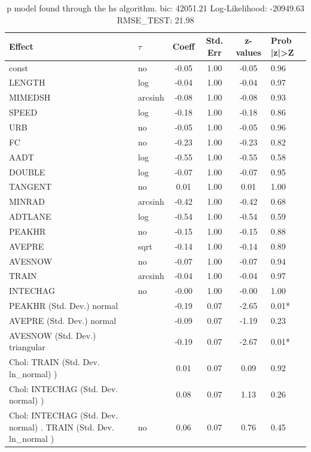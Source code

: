 \begin{table}
	\caption{p model found through the hs algorithm. bic: 42051.21 Log-Likelihood: -20949.63 RMSE_TEST: 21.98}
	\begin{center}
		\begin{tabular}{|l|l|c|c|c|l|}
			\hline
			Effect & $\tau$ & Coeff & Std. Err & z-values & Prob |z|>Z \\
			\hline
			const & no & -0.05 & 1.00 & -0.05 & 0.96 \\
			\hline
			LENGTH & log & -0.04 & 1.00 & -0.04 & 0.97 \\
			\hline
			MIMEDSH & arcsinh & -0.08 & 1.00 & -0.08 & 0.93 \\
			\hline
			SPEED & log & -0.18 & 1.00 & -0.18 & 0.86 \\
			\hline
			URB & no & -0.05 & 1.00 & -0.05 & 0.96 \\
			\hline
			FC & no & -0.23 & 1.00 & -0.23 & 0.82 \\
			\hline
			AADT & log & -0.55 & 1.00 & -0.55 & 0.58 \\
			\hline
			DOUBLE & log & -0.07 & 1.00 & -0.07 & 0.95 \\
			\hline
			TANGENT & no & 0.01 & 1.00 & 0.01 & 1.00 \\
			\hline
			MINRAD & arcsinh & -0.42 & 1.00 & -0.42 & 0.68 \\
			\hline
			ADTLANE & log & -0.54 & 1.00 & -0.54 & 0.59 \\
			\hline
			PEAKHR & no & -0.15 & 1.00 & -0.15 & 0.88 \\
			\hline
			AVEPRE & sqrt & -0.14 & 1.00 & -0.14 & 0.89 \\
			\hline
			AVESNOW & no & -0.07 & 1.00 & -0.07 & 0.94 \\
			\hline
			TRAIN & arcsinh & -0.04 & 1.00 & -0.04 & 0.97 \\
			\hline
			INTECHAG & no & -0.00 & 1.00 & -0.00 & 1.00 \\
			\hline
			PEAKHR (Std. Dev.) normal &  & -0.19 & 0.07 & -2.65 & 0.01* \\
			\hline
			AVEPRE (Std. Dev.) normal &  & -0.09 & 0.07 & -1.19 & 0.23 \\
			\hline
			AVESNOW (Std. Dev.) triangular &  & -0.19 & 0.07 & -2.67 & 0.01* \\
			\hline
			 Chol: TRAIN (Std. Dev. ln_normal) ) &  & 0.01 & 0.07 & 0.09 & 0.92 \\
			\hline
			 Chol: INTECHAG (Std. Dev. normal) ) &  & 0.08 & 0.07 & 1.13 & 0.26 \\
			\hline
			 Chol: INTECHAG (Std. Dev. normal) . TRAIN (Std. Dev.   ln_normal ) & no & 0.06 & 0.07 & 0.76 & 0.45 \\

\end{tabular}
\end{center}
\end{table}
